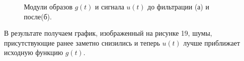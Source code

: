 \documentclass[a5paper, 10pt]{article}
\theoremstyle{definition}
\theoremstyle{plain}
\theoremstyle{remark}
\begin{document}
\begin{figure}[h!]
\begin{minipage}[h]{0.5\linewidth}
\end{minipage}
\hfill
\begin{minipage}[h]{0.5\linewidth}
\end{minipage}
\caption{Модули образов $g(t)$ и сигнала $u(t)$ до фильтрации (а) и после(б).}
\end{figure}

\newpage
В результате получаем график, изображенный на рисунке 19, шумы, присутствующие ранее заметно снизились и теперь $u(t)$ лучше приближает исходную функцию $g(t)$.\\
\end{document}
